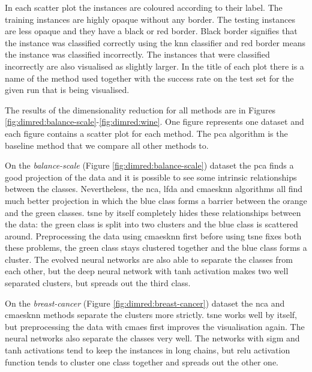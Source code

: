 \documentclass[12pt,a4paper]{report}
\begin{document}
In each scatter plot the instances are coloured according to their label. The training instances are highly opaque without any border. The testing instances are less opaque and they have a black or red border. Black border signifies that the instance was classified correctly using the \ac{knn} classifier and red border means the instance was classified incorrectly. The instances that were classified incorrectly are also visualised as slightly larger. In the title of each plot there is a name of the method used together with the success rate on the test set for the given run that is being visualised.

The results of the dimensionality reduction for all methods are in Figures \ref{fig:dimred:balance-scale}-\ref{fig:dimred:wine}. One figure represents one dataset and each figure contains a scatter plot for each method. The \ac{pca} algorithm is the baseline method that we compare all other methods to. 

On the \textit{balance-scale} (Figure \ref{fig:dimred:balance-scale}) dataset the \ac{pca} finds a good projection of the data and it is possible to see some intrinsic relationships between the classes. Nevertheless, the \ac{nca}, \ac{lfda} and \ac{cmaesknn} algorithms all find much better projection in which the blue class forms a barrier between the orange and the green classes. \ac{tsne} by itself completely hides these relationships between the data: the green class is split into two clusters and the blue class is scattered around. Preprocessing the data using \ac{cmaesknn} first before using \ac{tsne} fixes both these problems, the green class stays clustered together and the blue class forms a cluster. The evolved neural networks are also able to separate the classes from each other, but the deep neural network with \ac{tanh} activation makes two well separated clusters, but spreads out the third class.

On the \textit{breast-cancer} (Figure \ref{fig:dimred:breast-cancer}) dataset the \ac{nca} and \ac{cmaesknn} methods separate the clusters more strictly. \ac{tsne} works well by itself, but preprocessing the data with \ac{cmaes} first improves the visualisation again. The neural networks also separate the classes very well. The networks with \ac{sigm} and \ac{tanh} activations tend to keep the instances in long chains, but \ac{relu} activation function tends to cluster one class together and spreads out the other one.
\end{document}
